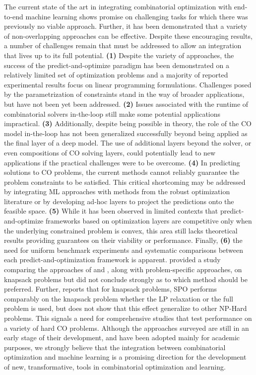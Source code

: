 The current state of the art in integrating combinatorial optimization with end-to-end machine learning 
shows promise on challenging tasks for which there was previously no viable approach. Further, it has been demonstrated that a variety of non-overlapping approaches  can be effective.  Despite these encouraging results, a number of challenges remain that must be addressed to allow an integration that lives up to its full potential.
{\bf (1)} Despite the variety of approaches, the success of the predict-and-optimize paradigm has been demonstrated on a relatively limited set of optimization problems and a majority of reported experimental results focus on linear programming formulations. 
Challenges posed by the parametrization of constraints stand in the way of broader applications, but have not been yet been addressed. 
{\bf (2)} Issues associated with the runtime of combinatorial solvers in-the-loop still make some potential applications impractical. 
{\bf (3)} Additionally, despite being possible in theory, the role of the CO model in-the-loop has not been generalized successfully beyond being applied as the final layer of a deep model. The use of additional layers beyond the solver, or even compositions of CO solving layers, could potentially lead to new applications if the practical challenges were to be overcome.  
{\bf (4)} In predicting solutions to CO problems, the current methods cannot reliably guarantee the problem constraints to be satisfied. This critical shortcoming may be addressed by integrating ML approaches with methods from the robust optimization literature or by developing ad-hoc layers to project the predictions onto the feasible space. {\bf (5)} While it has been observed in limited contexts  that predict-and-optimize frameworks based on optimization layers are competitive only when the underlying constrained problem is convex, this area still lacks theoretical results providing guarantees on their viability or performance.
Finally, {\bf (6)} the need for uniform benchmark experiments and systematic comparisons between each predict-and-optimization framework is apparent.  provided a study comparing the approaches of  and , along with problem-specific approaches, on knapsack problems but did not conclude strongly as to which method should be preferred. Further,  reports that for knapsack problems, SPO performs comparably on the knapsack problem whether the LP relaxation or the full problem is used, but does not show that this effect generalize to other NP-Hard problems. This signals a need for comprehensive studies that test performance on a variety of hard CO problems.
Although the approaches surveyed are still in an early stage of their development, and have been adopted mainly for academic purposes, we strongly believe that the integration between combinatorial optimization and machine learning is a promising direction for the development of new, transformative, tools in combinatorial optimization and learning. 
